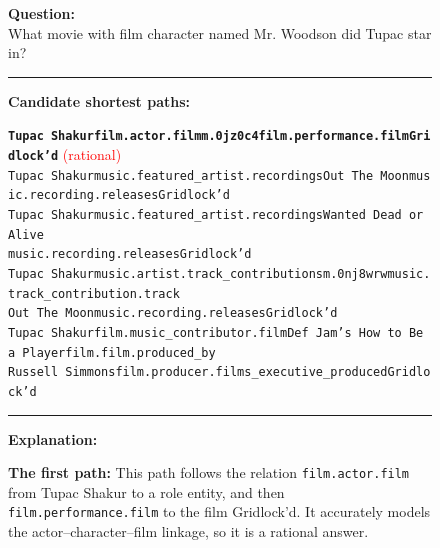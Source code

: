 \begin{figure}[t]
\begin{tcolorbox}[colback=gray!5!white,
                  colframe=gray!75!black,
                  title=WebQTest-415\_b6ad66a3f1f515d0688c346e16d202e6]
\scriptsize

\textbf{Question:}\\
What movie with film character named Mr. Woodson did Tupac star in?

\rule{\linewidth}{0.4pt}

\textbf{Candidate shortest paths:}\\[2pt]
{\raggedright
\texttt{\textbf{Tupac Shakur\patharrow film.actor.film\patharrow m.0jz0c4\patharrow film.performance.film\patharrow Gridlock'd}}\hfill
\textcolor{red}{(rational)}\\[6pt]

\texttt{Tupac Shakur\patharrow music.featured\_artist.recordings\patharrow Out The Moon\patharrow music.recording.releases\patharrow Gridlock'd}\\[6pt]

\texttt{Tupac Shakur\patharrow music.featured\_artist.recordings\patharrow Wanted Dead or Alive \\ \patharrow music.recording.releases\patharrow Gridlock'd}\\[6pt]

\texttt{Tupac Shakur\patharrow music.artist.track\_contributions\patharrow m.0nj8wrw\patharrow music.track\_contribution.track \\ \patharrow Out The Moon\patharrow music.recording.releases\patharrow Gridlock'd}\\[6pt]

\texttt{Tupac Shakur\patharrow film.music\_contributor.film\patharrow Def Jam's How to Be a Player\patharrow film.film.produced\_by \\ \patharrow Russell Simmons\patharrow film.producer.films\_executive\_produced\patharrow Gridlock'd}\\[6pt]

\par}

\rule{\linewidth}{0.4pt}

\textbf{Explanation:}\\[2pt]
{\raggedright
\textbf{The first path:} This path follows the relation \texttt{film.actor.film} from Tupac Shakur to a role entity, and then \texttt{film.performance.film} to the film Gridlock'd. It accurately models the actor–character–film linkage, so it is a rational answer.\par\vspace{6pt}

}
\end{tcolorbox}
\end{figure}
